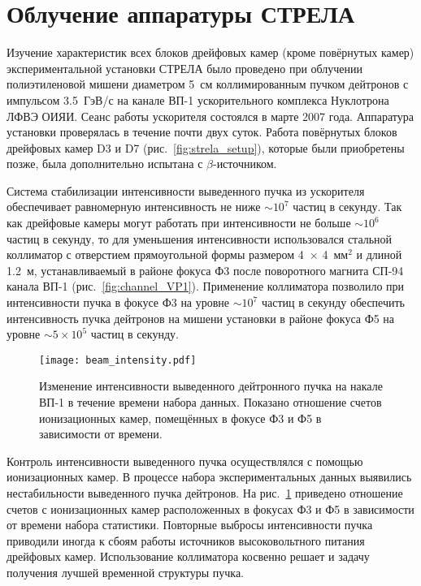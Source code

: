 \section{Облучение аппаратуры СТРЕЛА}
Изучение характеристик всех блоков дрейфовых камер (кроме повёрнутых камер)
экспериментальной установки СТРЕЛА было проведено при облучении полиэтиленовой
мишени диаметром 5~см коллимированным пучком дейтронов с импульсом 3.5~ГэВ/с
на канале ВП-1 ускорительного комплекса Нуклотрона ЛФВЭ ОИЯИ. Сеанс работы
ускорителя состоялся в марте 2007 года. Аппаратура установки проверялась в
течение почти двух суток. Работа повёрнутых блоков дрейфовых камер D3 и D7
(рис.~\ref{fig:strela_setup}), которые были приобретены позже, была
дополнительно испытана с $\beta$-источником.

Система стабилизации интенсивности выведенного пучка из ускорителя обеспечивает
равномерную интенсивность не ниже $\sim 10^{7}$ частиц в секунду. Так как
дрейфовые камеры могут работать при интенсивности не больше $\sim 10^{6}$ частиц
в секунду, то для уменьшения интенсивности использовался стальной коллиматор с
отверстием прямоугольной формы размером 4~$\times$ 4~мм$^2$ и длиной 1.2~м,
устанавливаемый в районе фокуса Ф3 после поворотного магнита СП-94 канала ВП-1
(рис.~\ref{fig:channel_VP1}). Применение коллиматора позволило при интенсивности
пучка в фокусе Ф3 на уровне $\sim 10^{7}$ частиц в секунду обеспечить
интенсивность пучка дейтронов на мишени установки в районе фокуса Ф5 на
уровне $\sim 5 \times 10^{5}$ частиц в секунду.

\vspace{-0.1cm}
\begin{figure}[h]
  \centering
  \texttt{[image: beam\_intensity.pdf]}
  \caption{Изменение интенсивности выведенного дейтронного пучка на накале ВП-1
    в течение времени набора данных. Показано отношение счетов ионизационных
    камер, помещённых в фокусе Ф3 и Ф5 в зависимости от времени.}
  \label{fig:beam_intensity}
\end{figure}

Контроль интенсивности выведенного пучка осуществлялся с помощью ионизационных
камер. В процессе набора экспериментальных данных выявились нестабильности
выведенного пучка дейтронов. На рис.~\ref{fig:beam_intensity} приведено
отношение счетов с ионизационных камер расположенных в фокусах Ф3 и Ф5 в
зависимости от времени набора статистики. Повторные выбросы интенсивности пучка
приводили иногда к сбоям работы источников высоковольтного питания дрейфовых
камер. Использование коллиматора косвенно решает и задачу получения лучшей
временной структуры пучка.

